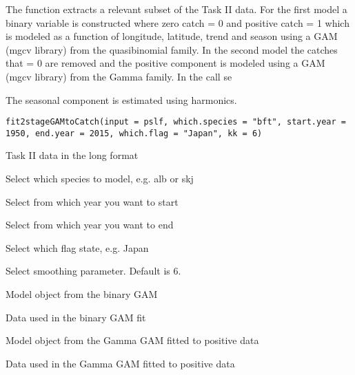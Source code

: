 \documentclass[letterpaper]{book}
\begin{document}
%
\begin{Description}\relax
The function extracts a relevant subset of the Task II data. For the first model a binary variable is constructed where zero catch = 0 and positive catch = 1 which is modeled as a function of longitude, latitude, trend and season using a GAM (mgcv library) from the quasibinomial family.  In the second model the catches that = 0 are removed and the positive component is modeled using a GAM (mgcv library) from the Gamma family. In the call se

The seasonal component is estimated using harmonics.
\end{Description}
%
\begin{Usage}
\begin{verbatim}
fit2stageGAMtoCatch(input = pslf, which.species = "bft", start.year = 1950, end.year = 2015, which.flag = "Japan", kk = 6)
\end{verbatim}
\end{Usage}
%
\begin{Arguments}
\begin{ldescription}
\item[\code{input}] 
Task II data in the long format

\item[\code{which.species}] 
Select which species to model, e.g. alb or skj

\item[\code{start.year}] 
Select from which year you want to start

\item[\code{end.year}] 
Select from which year you want to end

\item[\code{which.flag}] 
Select which flag state, e.g. Japan

\item[\code{kk}] 
Select smoothing parameter. Default is 6. 

\end{ldescription}
\end{Arguments}
%
\begin{Value}

\begin{ldescription}
\item[\code{pmod}] Model object from the binary GAM
\item[\code{pmod.data }] Data used in the binary GAM fit
\item[\code{gmod}] Model object from the Gamma GAM fitted to positive data
\item[\code{gmod.data}] Data used in the Gamma GAM fitted to positive data

\end{ldescription}
\end{Value}
\end{document}
